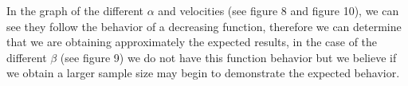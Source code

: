 In the graph of the different $\alpha$ and velocities (see figure 8 and figure 10), we can see they follow the behavior of a decreasing function, therefore we can determine that we are obtaining approximately the expected results, in the case of the different $\beta$ (see figure 9) we do not have this function behavior but we believe if we obtain a larger sample size may begin to demonstrate the expected behavior.

\newpage


